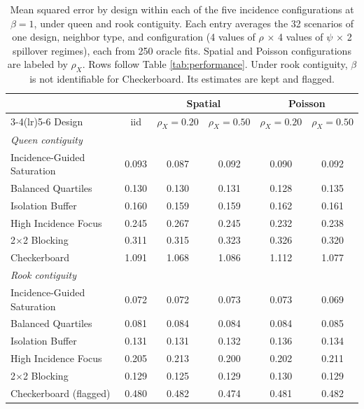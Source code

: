 \documentclass[11pt]{article}
\begin{document}
\iffullsi
\begin{table}[!htb]

\small
\centering
\setlength{\tabcolsep}{4pt}

\caption{Mean squared error by design within each of the five incidence configurations at $\beta = 1$, under queen and rook contiguity. Each entry averages the 32 scenarios of one design, neighbor type, and configuration (4 values of $\rho$ $\times$ 4 values of $\psi$ $\times$ 2 spillover regimes), each from 250 oracle fits. Spatial and Poisson configurations are labeled by $\rho_X$. Rows follow Table \ref{tab:performance}. Under rook contiguity, $\beta$ is not identifiable for Checkerboard. Its estimates are kept and flagged.}
\label{tab:by-config}

\begin{tabular}{lccccc}

\toprule
& & \multicolumn{2}{c}{Spatial} & \multicolumn{2}{c}{Poisson} \\
\cmidrule(lr){3-4}\cmidrule(lr){5-6}
Design & iid & $\rho_X=0.20$ & $\rho_X=0.50$ & $\rho_X=0.20$ & $\rho_X=0.50$ \\

\midrule
\multicolumn{6}{l}{\textit{Queen contiguity}} \\
Incidence-Guided Saturation & 0.093 & 0.087 & 0.092 & 0.090 & 0.092 \\
Balanced Quartiles & 0.130 & 0.130 & 0.131 & 0.128 & 0.135 \\
Isolation Buffer & 0.160 & 0.159 & 0.159 & 0.162 & 0.161 \\
High Incidence Focus & 0.245 & 0.267 & 0.245 & 0.232 & 0.238 \\
2$\times$2 Blocking & 0.311 & 0.315 & 0.323 & 0.326 & 0.320 \\
Checkerboard & 1.091 & 1.068 & 1.086 & 1.112 & 1.077 \\

\midrule
\multicolumn{6}{l}{\textit{Rook contiguity}} \\
Incidence-Guided Saturation & 0.072 & 0.072 & 0.073 & 0.073 & 0.069 \\
Balanced Quartiles & 0.081 & 0.084 & 0.084 & 0.084 & 0.085 \\
Isolation Buffer & 0.131 & 0.131 & 0.132 & 0.136 & 0.134 \\
High Incidence Focus & 0.205 & 0.213 & 0.200 & 0.202 & 0.211 \\
2$\times$2 Blocking & 0.129 & 0.125 & 0.129 & 0.130 & 0.129 \\
Checkerboard (flagged) & 0.480 & 0.482 & 0.474 & 0.481 & 0.482 \\

\bottomrule

\end{tabular}

\end{table}
\fi
\end{document}
